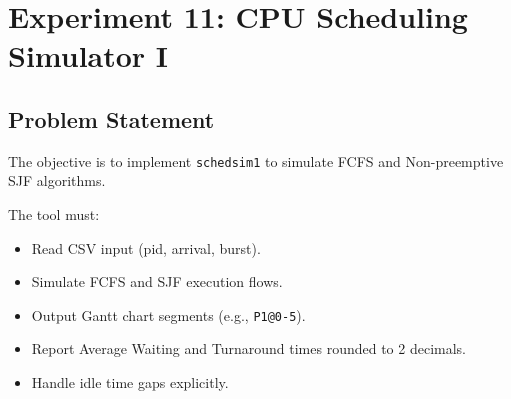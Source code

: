 
\section{Experiment 11: CPU Scheduling Simulator I}

\subsection{Problem Statement}
The objective is to implement \texttt{schedsim1} to simulate FCFS and Non-preemptive SJF algorithms.

The tool must:
\begin{itemize}
    \item Read CSV input (pid, arrival, burst).
    \item Simulate FCFS and SJF execution flows.
    \item Output Gantt chart segments (e.g., \verb|P1@0-5|).
    \item Report Average Waiting and Turnaround times rounded to 2 decimals.
    \item Handle idle time gaps explicitly.
\end{itemize}

